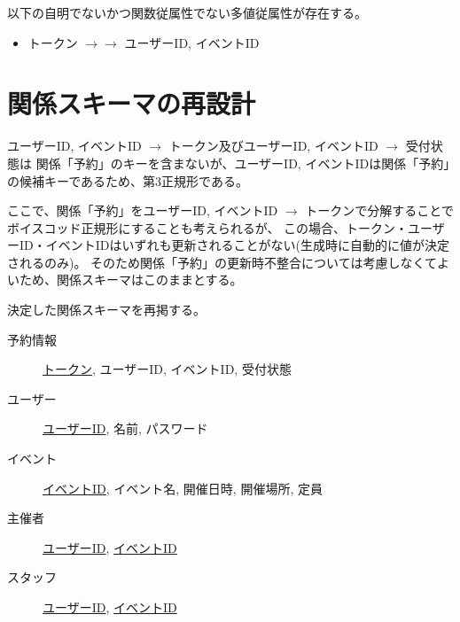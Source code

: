 \documentclass[dvipdfmx]{jarticle}
\begin{document}
以下の自明でないかつ関数従属性でない多値従属性が存在する。
\begin{itemize}
  \item {トークン} $\rightarrow \rightarrow$ {ユーザーID, イベントID}
\end{itemize}

\section{関係スキーマの再設計}

{ユーザーID, イベントID} $\rightarrow$ {トークン}及び{ユーザーID, イベントID} $\rightarrow$ {受付状態}は
関係「予約」のキーを含まないが、{ユーザーID, イベントID}は関係「予約」の候補キーであるため、第3正規形である。

ここで、関係「予約」を{ユーザーID, イベントID} $\rightarrow$ {トークン}で分解することでボイスコッド正規形にすることも考えられるが、
この場合、トークン・ユーザーID・イベントIDはいずれも更新されることがない(生成時に自動的に値が決定されるのみ)。
そのため関係「予約」の更新時不整合については考慮しなくてよいため、関係スキーマはこのままとする。

決定した関係スキーマを再掲する。

\begin{description}
  \item[予約情報] \underline{トークン}, ユーザーID, イベントID, 受付状態
  \item[ユーザー] \underline{ユーザーID}, 名前, パスワード
  \item[イベント] \underline{イベントID}, イベント名, 開催日時, 開催場所, 定員
  \item[主催者] \underline{ユーザーID}, \underline{イベントID}  
  \item[スタッフ] \underline{ユーザーID}, \underline{イベントID} 
\end{description}
\end{document}
